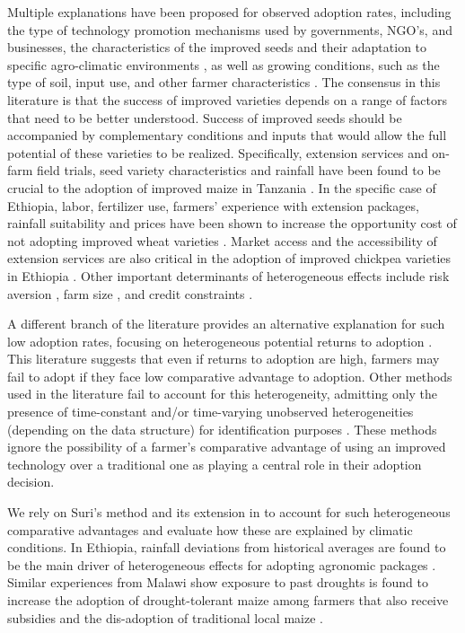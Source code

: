 \documentclass{article}
\begin{document}
Multiple explanations have been proposed for observed adoption rates, including the type of technology promotion mechanisms used by governments, NGO’s, and businesses, the characteristics of the improved seeds and their adaptation to specific agro-climatic environments \citep{Bird2020-nt}, as well as growing conditions, such as the type of soil, input use, and other farmer characteristics \citep{Munshi2004-og}. The consensus in this literature is that the success of improved varieties depends on a range of factors that need to be better understood. Success of improved seeds should be accompanied by complementary conditions and inputs that would allow the full potential of these varieties to be realized. Specifically, extension services and on-farm field trials, seed variety characteristics and rainfall have been found to be crucial to the adoption of improved maize in Tanzania \citep{Kaliba2000-jh}. In the specific case of Ethiopia, labor, fertilizer use, farmers’ experience with extension packages, rainfall suitability and prices have been shown to increase the opportunity cost of not adopting improved wheat varieties \citep{Wale2006-bv}. Market access and the accessibility of extension services are also critical in the adoption of improved chickpea varieties in Ethiopia \citep{Verkaart2019-ol}. Other important determinants of heterogeneous effects include risk aversion \citep{Holden2016-vy}, farm size \citep{Ghimire2015-bd}, and credit constraints \citep{Simtowe2008-jn,Balana2020-hx}.

A different branch of the literature provides an alternative explanation for such low adoption rates, focusing on heterogeneous potential returns to adoption \citep{Suri2011-oi}. This literature suggests that even if returns to adoption are high, farmers may fail to adopt if they face low comparative advantage to adoption. Other methods used in the literature fail to account for this heterogeneity, admitting only the presence of time-constant and/or time-varying unobserved heterogeneities (depending on the data structure) for identification purposes \citep{Kassie2018-xn,Falco2011-rt}. These methods ignore the possibility of a farmer’s comparative advantage of using an improved technology over a traditional one as playing a central role in their adoption decision. 


We rely on Suri’s method and its extension in \citep{Tjernstrom_Emilia_Dalia_Ghanem_Oscar_Barriga_Cabanillas_Travis_J_Lybbert_Jeffrey_D_Michler_and_Aleksandr_Michuda2020-bc} to account for such heterogeneous comparative advantages and evaluate how these are explained by climatic conditions. In Ethiopia, rainfall deviations from historical averages are found to be the main driver of heterogeneous effects for adopting agronomic packages \citep{Marenya2020-kb}. Similar experiences from Malawi show exposure to past droughts is found to increase the adoption of drought-tolerant maize among farmers that also receive subsidies \citep{Katengeza2019-af} and the dis-adoption of traditional local maize \citep{Holden2016-vy}.
\end{document}
